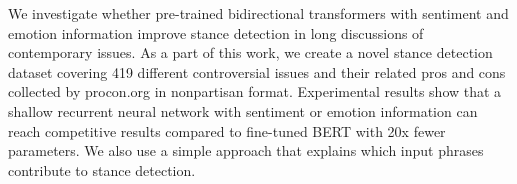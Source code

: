 We investigate whether pre-trained bidirectional transformers with sentiment and emotion information improve stance detection in long discussions of contemporary issues.  As a part of this work, we create a novel stance detection dataset covering 419 different controversial issues and their related pros and cons collected by procon.org in nonpartisan format. Experimental results show that a shallow recurrent neural network with sentiment or emotion information can reach competitive results compared to fine-tuned BERT with 20x fewer parameters. We also use a simple approach that explains which input phrases contribute to stance detection.
